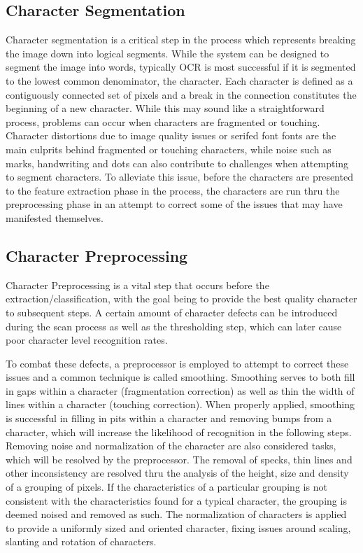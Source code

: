 \subsection{Character Segmentation}

Character segmentation is a critical step in the process which represents breaking the image down into logical segments. While the system can be designed to segment the image into words, typically OCR is most successful if it is segmented to the lowest common denominator, the character. Each character is defined as a contiguously connected set of pixels and a break in the connection constitutes the beginning of a new character. While this may sound like a straightforward process, problems can occur when characters are fragmented or touching. Character distortions due to image quality issues or serifed font fonts are the main culprits behind fragmented or touching characters, while noise such as marks, handwriting and dots can also contribute to challenges when attempting to segment characters. To alleviate this issue, before the characters are presented to the feature extraction phase in the process, the characters are run thru the preprocessing phase in an attempt to correct some of the issues that may have manifested themselves\cite{hid-sp18-414-www-eikvilocr}.

\subsection{ Character Preprocessing}

Character Preprocessing is a vital step that occurs before the extraction/classification, with the goal being to provide the best quality character to subsequent steps. A certain amount of character defects can be introduced during the scan process as well as the thresholding step, which can later cause poor character level recognition rates.

To combat these defects, a preprocessor is employed to attempt to correct these issues and a common technique is called smoothing. Smoothing serves to both fill in gaps within a character (fragmentation correction) as well as thin the width of lines within a character (touching correction). When properly applied, smoothing is successful in filling in pits within a character and removing bumps from a character, which will increase the likelihood of recognition in the following steps\cite{hid-sp18-414-www-eikvilocr}. Removing noise and normalization of the character are also considered tasks, which will be resolved by the preprocessor. The removal of specks, thin lines and other inconsistency are resolved thru the analysis of the height, size and density of a grouping of pixels. If the characteristics of a particular grouping is not consistent with the characteristics found for a typical character, the grouping is deemed noised and removed as such. The normalization of characters is applied to provide a uniformly sized and oriented character, fixing issues around scaling, slanting and rotation of characters. 


